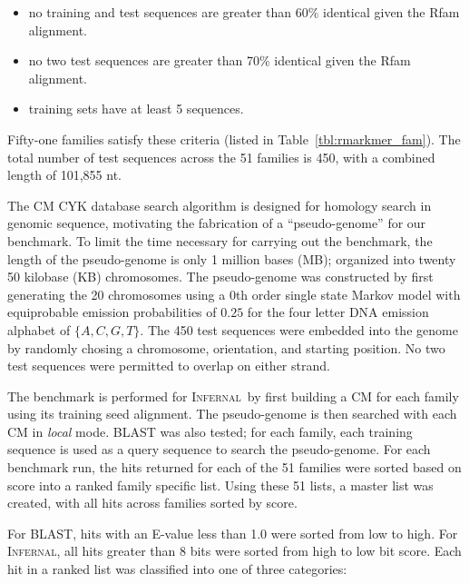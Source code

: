 \documentclass[11pt]{article}
\def\infernal{\textsc{Infernal}~}
\begin{document}
\begin{itemize}
\item
no training and test sequences are greater than 60\% identical given
the Rfam alignment.
\item
no two test sequences are greater than 70\% identical given the Rfam
alignment.
\item
training sets have at least 5 sequences.
\end{itemize}

Fifty-one families satisfy these criteria (listed in
Table~\ref{tbl:rmarkmer_fam}). The total number of test sequences
across the 51 families is 450, with a combined length of 101,855 nt. 

The CM CYK database search algorithm is designed for homology search in
genomic sequence, motivating the fabrication of a
``pseudo-genome'' for our benchmark. To limit the time
necessary for carrying out the benchmark, the length of the
pseudo-genome is only 1 million bases (MB); organized into twenty 50
kilobase (KB) chromosomes.
The pseudo-genome was constructed by first
generating the 20 chromosomes using a 0th order single state Markov
model with equiprobable emission probabilities of $0.25$ for the four
letter DNA emission alphabet of $\{A,C,G,T\}$.
The 450 test sequences were embedded into the genome by
randomly chosing a chromosome, orientation, and starting
position. No two test sequences were permitted to overlap on either strand.

The benchmark is performed for \infernal by
first building a CM for each family using its training seed alignment.
The pseudo-genome is then searched with each CM in \emph{local}
mode\@. \textsc{BLAST} was also tested; for each family, each training
sequence is used as a query sequence to search the pseudo-genome.
For each benchmark run, the hits returned for each of the 51
families were sorted based on score into a ranked family specific
list. Using these 51 lists, a master list was created, with all hits
across families sorted by score. 

For \textsc{BLAST}, hits with an E-value
less than 1.0 were sorted from low to high. For
\textsc{Infernal}, all hits greater than 8 bits were sorted from high to low
bit score.  Each hit in a ranked list was classified into one of
three categories:
\end{document}
